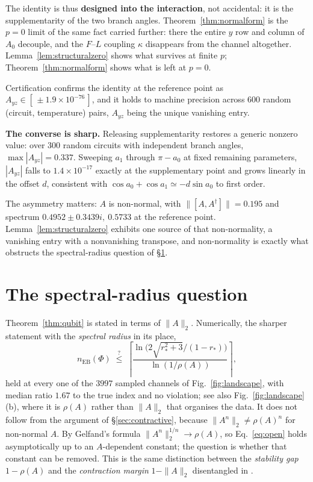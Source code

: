 \documentclass[11pt,a4paper]{article}
\theoremstyle{definition}
\theoremstyle{remark}
\begin{document}
The identity is thus \textbf{designed into the interaction}, not accidental: it is the supplementarity of the two branch angles. Theorem~\ref{thm:normalform} is the $p=0$ limit of the same fact carried further: there the entire $y$ row and column of $A_0$ decouple, and the $F$--$L$ coupling $\kappa$ disappears from the channel altogether. Lemma~\ref{lem:structuralzero} shows what survives at finite $p$; Theorem~\ref{thm:normalform} shows what is left at $p=0$.

Certification confirms the identity at the reference point as $A_{yz} \in [\,\pm 1.9\times10^{-76}\,]$, and it holds to machine precision across 600 random (circuit, temperature) pairs, $A_{yz}$ being the unique vanishing entry.

\textbf{The converse is sharp.} Releasing supplementarity restores a generic nonzero value: over 300 random circuits with independent branch angles, $\max|A_{yz}| = 0.337$. Sweeping $a_1$ through $\pi - a_0$ at fixed remaining parameters, $|A_{yz}|$ falls to $1.4\times10^{-17}$ exactly at the supplementary point and grows linearly in the offset $d$, consistent with $\cos a_0 + \cos a_1 \simeq -d\sin a_0$ to first order.

The asymmetry matters: $A$ is non-normal, with $\lVert[A,A^{\dagger}]\rVert = 0.195$ and spectrum $0.4952 \pm 0.3439i,\ 0.5733$ at the reference point. Lemma~\ref{lem:structuralzero} exhibits one source of that non-normality, a vanishing entry with a nonvanishing transpose, and non-normality is exactly what obstructs the spectral-radius question of \S\ref{sec:spectral}.

\section{The spectral-radius question}\label{sec:spectral}


Theorem~\ref{thm:qubit} is stated in terms of $\|A\|_2$. Numerically, the
sharper statement with the \emph{spectral radius} in its place,
\begin{equation}\label{eq:open}
  n_{\mathrm{EB}}(\Phi)\;\overset{?}{\le}\;
  \left\lceil\frac{\ln\bigl(2\sqrt{r_\ast^{2}+3}/(1-r_\ast)\bigr)}{\ln(1/\rho(A))}\right\rceil ,
\end{equation}
held at every one of the $3997$ sampled channels of
Fig.~\ref{fig:landscape}, with median ratio $1.67$ to the true index and no
violation; see also
Fig.~\ref{fig:landscape}(b), where it is $\rho(A)$ rather than $\|A\|_2$ that
organises the data. It does not follow from
the argument of \S\ref{sec:contractive}, because $\|A^{n}\|_2\ne\rho(A)^{n}$ for non-normal $A$. By
Gelfand's formula $\|A^n\|_2^{1/n}\to\rho(A)$, so Eq.~\eqref{eq:open} holds
asymptotically up to an $A$-dependent constant; the question is whether that
constant can be removed. This is the same distinction between the
\emph{stability gap} $1-\rho(A)$ and the \emph{contraction margin} $1-\|A\|_2$
disentangled in \cite[Sec.~II\,B]{PaperI}.
\end{document}
